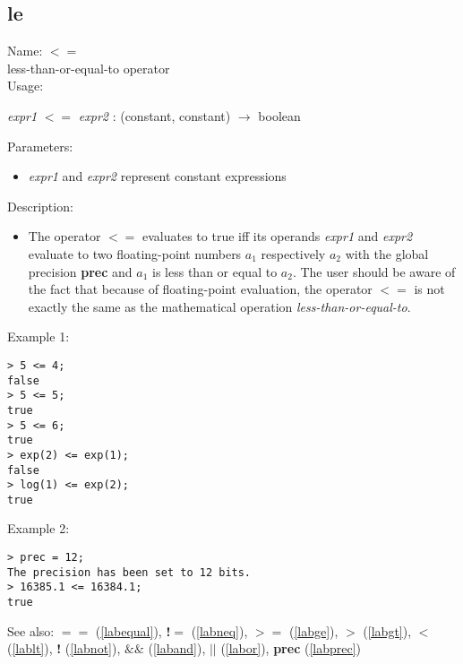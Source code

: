 \subsection{le}
\label{lable}
\noindent Name: \textbf{$<=$}\\
less-than-or-equal-to operator\\
\noindent Usage: 
\begin{center}
\emph{expr1} \textbf{$<=$} \emph{expr2} : (\textsf{constant}, \textsf{constant}) $\rightarrow$ \textsf{boolean}
\end{center}
Parameters: 
\begin{itemize}
\item \emph{expr1} and \emph{expr2} represent constant expressions
\end{itemize}
\noindent Description: \begin{itemize}

\item The operator \textbf{$<=$} evaluates to true iff its operands \emph{expr1} and
   \emph{expr2} evaluate to two floating-point numbers $a_1$
   respectively $a_2$ with the global precision \textbf{prec} and
   $a_1$ is less than or equal to $a_2$. The user should
   be aware of the fact that because of floating-point evaluation, the
   operator \textbf{$<=$} is not exactly the same as the mathematical
   operation \emph{less-than-or-equal-to}.
\end{itemize}
\noindent Example 1: 
\begin{center}\begin{minipage}{15cm}\begin{Verbatim}[frame=single]
> 5 <= 4;
false
> 5 <= 5;
true
> 5 <= 6;
true
> exp(2) <= exp(1);
false
> log(1) <= exp(2);
true
\end{Verbatim}
\end{minipage}\end{center}
\noindent Example 2: 
\begin{center}\begin{minipage}{15cm}\begin{Verbatim}[frame=single]
> prec = 12;
The precision has been set to 12 bits.
> 16385.1 <= 16384.1;
true
\end{Verbatim}
\end{minipage}\end{center}
See also: \textbf{$==$} (\ref{labequal}), \textbf{!$=$} (\ref{labneq}), \textbf{$>=$} (\ref{labge}), \textbf{$>$} (\ref{labgt}), \textbf{$<$} (\ref{lablt}), \textbf{!} (\ref{labnot}), \textbf{$\&\&$} (\ref{laband}), \textbf{$||$} (\ref{labor}), \textbf{prec} (\ref{labprec})
